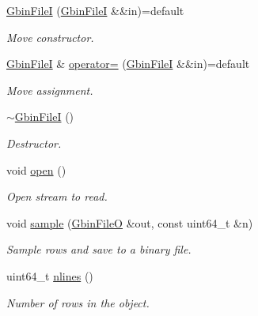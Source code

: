 \begin{DoxyCompactItemize}
\hyperlink{classsamp_files_1_1_gbin_file_i_a62f43b4cacd682e70c3ad8ae5d674d08}{Gbin\+FileI} (\hyperlink{classsamp_files_1_1_gbin_file_i}{Gbin\+FileI} \&\&in)=default
\begin{DoxyCompactList}\small\item\em Move constructor. \end{DoxyCompactList}\item 
\mbox{\label{classsamp_files_1_1_gbin_file_i_a7ad74147ff93849a4e5f8e5c6414a89f}} 
\hyperlink{classsamp_files_1_1_gbin_file_i}{Gbin\+FileI} \& \hyperlink{classsamp_files_1_1_gbin_file_i_a7ad74147ff93849a4e5f8e5c6414a89f}{operator=} (\hyperlink{classsamp_files_1_1_gbin_file_i}{Gbin\+FileI} \&\&in)=default
\begin{DoxyCompactList}\small\item\em Move assignment. \end{DoxyCompactList}\item 
\mbox{\label{classsamp_files_1_1_gbin_file_i_a71dcb1dfbd6fd14b7084621dbab316f6}} 
\hyperlink{classsamp_files_1_1_gbin_file_i_a71dcb1dfbd6fd14b7084621dbab316f6}{$\sim$\+Gbin\+FileI} ()
\begin{DoxyCompactList}\small\item\em Destructor. \end{DoxyCompactList}\item 
\mbox{\label{classsamp_files_1_1_gbin_file_i_af32079a08976e9343e2c9a4cb849e4e4}} 
void \hyperlink{classsamp_files_1_1_gbin_file_i_af32079a08976e9343e2c9a4cb849e4e4}{open} ()
\begin{DoxyCompactList}\small\item\em Open stream to read. \end{DoxyCompactList}\item 
void \hyperlink{classsamp_files_1_1_gbin_file_i_ac79d132333217db28039510da20ce54e}{sample} (\hyperlink{classsamp_files_1_1_gbin_file_o}{Gbin\+FileO} \&out, const uint64\+\_\+t \&n)
\begin{DoxyCompactList}\small\item\em Sample rows and save to a binary file. \end{DoxyCompactList}\item 
\mbox{\label{classsamp_files_1_1_gbin_file_i_a702074c0aa85213bee9f6ec19ef98de2}} 
uint64\+\_\+t \hyperlink{classsamp_files_1_1_gbin_file_i_a702074c0aa85213bee9f6ec19ef98de2}{nlines} ()
\begin{DoxyCompactList}\small\item\em Number of rows in the object. \end{DoxyCompactList}\end{DoxyCompactItemize}
